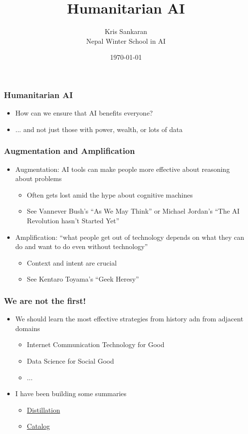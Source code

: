 \documentclass[10pt,mathserif]{beamer}
\title{\large \bfseries Humanitarian AI}
\author{Kris Sankaran\\[3ex] Nepal Winter School in AI}
\date{\today}
\begin{document}
\maketitle

\begin{frame}
  \frametitle{Humanitarian AI}
  \begin{itemize}
  \item How can we ensure that AI benefits everyone?
  \item ... and not just those with power, wealth, or lots of data
  \end{itemize}
\end{frame}

\begin{frame}
  \frametitle{Augmentation and Amplification}
  \begin{itemize}
  \item Augmentation: AI tools can make people more effective about reasoning
    about problems
    \begin{itemize}
    \item Often gets lost amid the hype about cognitive machines
    \item See Vannever Bush's ``As We May Think'' or Michael Jordan's ``The AI
      Revolution hasn't Started Yet''
    \end{itemize}
  \item Amplification: ``what people get out of technology depends on what they
    can do and want to do even without technology''
    \begin{itemize}
    \item Context and intent are crucial
    \item See Kentaro Toyama's ``Geek Heresy''
    \end{itemize}
  \end{itemize}
\end{frame}

\begin{frame}
  \frametitle{We are not the first!}
  \begin{itemize}
  \item We should learn the most effective strategies from history adn from
    adjacent domains
    \begin{itemize}
    \item Internet Communication Technology for Good
    \item Data Science for Social Good
    \item ...
    \end{itemize}
  \item I have been building some summaries
    \begin{itemize}
    \item \href{https://docs.google.com/document/d/17zkL8ql4JcM8knAEJfRtmgtUCiv-7PyYaZlMTkkvkYM/edit#}{Distillation}
    \item \href{https://docs.google.com/spreadsheets/d/1J012R_UeZnJPbADdc_8iXmoLsDXv_-vGQOOo8yWBZKM/edit#gid=0}{Catalog}
    \end{itemize}
  \end{itemize} 
\end{frame}
\end{document}
